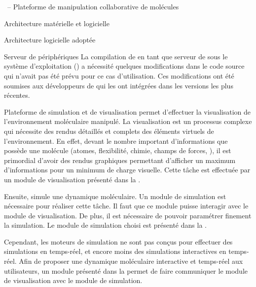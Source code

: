 \documentclass[myfrancais,ngerman,english,french]{mythesis}
\begin{document}
\begin{mychapter}{\myShaddock\ -- Plateforme de manipulation collaborative de molécules}
\begin{mysection}{Architecture matérielle et logicielle}
\begin{mysubsection}{Architecture logicielle adoptée}
\begin{mysubsubsection}{Serveur de périphériques}
					La compilation de  en tant que serveur de \myOmni sous le système d'exploitation \myLinux (\myUbuntu) a nécessité quelques modifications dans le code source qui n'avait pas été prévu pour ce cas d'utilisation.
					Ces modifications ont été soumises aux développeurs de  qui les ont intégrées dans les versions les plus récentes.
				\end{mysubsubsection}
			\end{mysubsection}
		\end{mysection}
		\begin{mysection}{Plateforme de simulation et de visualisation}
			\myShaddock permet d'effectuer la visualisation de l'environnement moléculaire manipulé.
			La visualisation est un processus complexe qui nécessite des rendus détaillés et complets des éléments virtuels de l'environnement.
			En effet, devant le nombre important d'informations que possède une molécule (atomes, flexibilité, chimie, champs de forces, \myetc), il est primordial d'avoir des rendus graphiques permettant d'afficher un maximum d'informations pour un minimum de charge visuelle.
			Cette tâche est effectuée par un module de visualisation présenté dans la .

			Ensuite, \myShaddock simule une dynamique moléculaire.
			Un module de simulation est nécessaire pour réaliser cette tâche.
			Il faut que ce module puisse interagir avec le module de visualisation.
			De plus, il est nécessaire de pouvoir paramétrer finement la simulation.
			Le module de simulation choisi est présenté dans la .

			Cependant, les moteurs de simulation ne sont pas conçus pour effectuer des simulations en temps-réel, et encore moins des simulations interactives en temps-réel.
			Afin de proposer une dynamique moléculaire interactive et temps-réel aux utilisateurs, un module présenté dans la  permet de faire communiquer le module de visualisation avec le module de simulation.


\end{mysection}
\end{mychapter}
\end{document}
